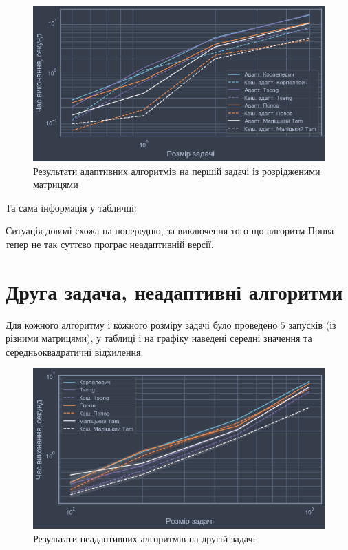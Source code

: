 \begin{figure}[H]
    \centering
    \includegraphics[width=\textwidth]{img/1/sparse/adapt/time.png}
    \caption{Результати адаптивних алгоритмів на першій задачі із розрідженими матрицями}
\end{figure}

Та сама інформація у табличці:





Ситуація доволі схожа на попередню, за виключення того що алгоритм Попва тепер не так суттєво програє неадаптивній версії.

\section{Друга задача, неадаптивні алгоритми}

Для кожного алгоритму і кожного розміру задачі було проведено $5$ запусків (із різними матрицями), у таблиці і на графіку наведені середні значення та середньоквадратичні відхилення.

\begin{figure}[H]
    \centering
    \includegraphics[width=\textwidth]{img/2/time.png}
    \caption{Результати неадаптивних алгоритмів на другій задачі}
\end{figure}

